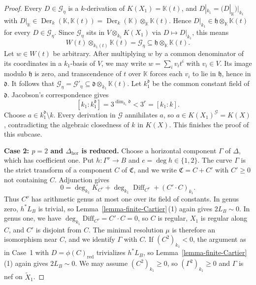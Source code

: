 \documentclass[10pt,abstract=true]{scrartcl}
\numberwithin{equation}{section}
\theoremstyle{definition}
\theoremstyle{remark}
\begin{document}
\begin{proof}
  Every $D\in\mathscr G_\eta$ is a $k$-derivation of $K(X_1)=\mathbb K(t)$, and $D|_{k_1}=(D|_{\mathbb K})|_{k_1}$ with $D|_{\mathbb K}\in\operatorname{Der}_k(\mathbb K,\mathbb K(t))=\operatorname{Der}_k(\mathbb K)\otimes_{\mathbb K}\mathbb K(t)$.
  Hence $D|_{k_1}\in\mathfrak h\otimes_{\mathbb K}\mathbb K(t)$ for every $D\in\mathscr G_\eta$.
  Since $\mathscr G_\eta$ sits in $V\otimes_{k_1}K(X_1)$ via $D\mapsto D|_{k_1}$, this means
  \[
    W(t)\otimes_{k_1(t)}\mathbb K(t)=\mathscr G_\eta\subseteq\mathfrak h\otimes_{\mathbb K}\mathbb K(t).
  \]
  Let $w\in W(t)$ be arbitrary.
  After multiplying $w$ by a common denominator of its coordinates in a $k_1$-basis of $V$, we may write $w=\sum_i v_i t^i$ with $v_i\in V$.
  Its image modulo $\mathfrak h$ is zero, and transcendence of $t$ over $\mathbb K$ forces each $v_i$ to lie in $\mathfrak h$, hence in $\mathfrak d$.
  It follows that $\mathscr G_\eta=\mathscr G'_\eta\subseteq\mathfrak d\otimes_{k_1}\mathbb K(t)$.
  Let $k_1^{\mathfrak d}$ be the common constant field of $\mathfrak d$.
  Jacobson's correspondence \cite[pp.~561, 565]{Gerstenhaber-1964} gives
  \[
    [k_1:k_1^{\mathfrak d}]=3^{\dim_{k_1}\mathfrak d}<3^r=[k_1:k].
  \]
  Choose $a\in k_1^{\mathfrak d}\setminus k$.
  Every derivation in $\mathscr G$ annihilates $a$, so $a\in K(X_1)^{\mathscr G}=K(X)$, contradicting the algebraic closedness of $k$ in $K(X)$.
  This finishes the proof of this subcase.

  \par\smallskip
  \noindent\textbf{Case 2: $p=2$ and $\Delta_{\mathrm{hor}}$ is reduced.}
  Choose a horizontal component $\Gamma$ of $\Delta$, which has coefficient one.
  Put $h\colon\Gamma^\nu\to B$ and $e=\deg h\in\{1,2\}$.
  The curve $\Gamma$ is the strict transform of a component $C$ of $\mathfrak C$, and we write $\mathfrak C=C+C'$ with $C'\geq0$ not containing $C$.
  Adjunction gives
  \[
    0=\deg_{k_1}K_{C^\nu}
      +\deg_{k_1}\operatorname{Diff}_{C^\nu}+(C'\cdot C)_{k_1}.
  \]
  Thus $C^\nu$ has arithmetic genus at most one over its field of constants.
  In genus zero, $h^*L_B$ is trivial, so Lemma~\ref{lemma-finite-Cartier}\,\textup{(1)} again gives $2L_B\sim0$.
  In genus one, we have $\deg_{k_1} \mathrm{Diff}_{C^\nu} = C' \cdot C = 0$, so $C$ is regular, $X_1$ is regular along $C$, and $C'$ is disjoint from $C$.
  The minimal resolution $\mu$ is therefore an isomorphism near $C$, and we identify $\Gamma$ with $C$.
  If $(C^2)_{k_1}<0$, the argument as in Case~1 with $D=\phi(C)_{\mathrm{red}}$ trivializes $h^*L_B$, so Lemma~\ref{lemma-finite-Cartier}\,\textup{(1)} again gives $2L_B\sim0$.
  We may assume $(C^2)_{k_1}\geq0$, so $(\Gamma^2)_{k_1}\geq0$ and $\Gamma$ is nef on $\widetilde X_1$.


\end{proof}
\end{document}
